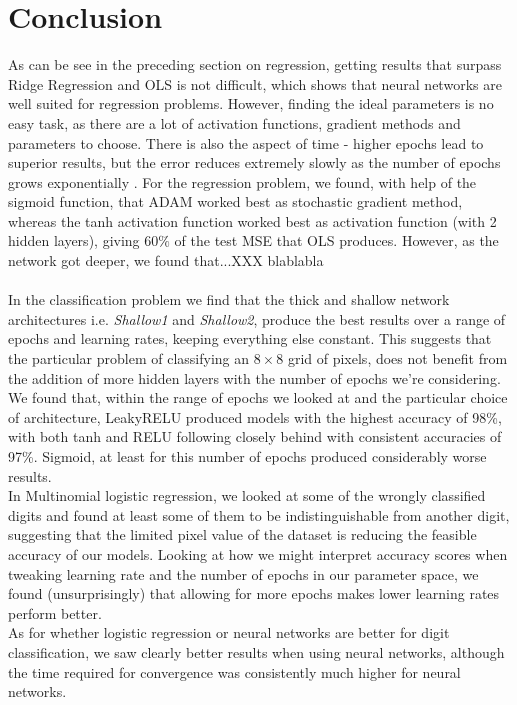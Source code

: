 \documentclass[11pt,a4paper,titlepage]{article}
\begin{document}
\section{Conclusion}
As can be see in the preceding section on regression, getting results that surpass Ridge Regression and OLS is not difficult, which shows that neural networks are well suited for regression problems. However, finding the ideal parameters is no easy task, as there are a lot of activation functions, gradient methods and parameters to choose. There is also the aspect of time - higher epochs lead to superior results, but the error reduces extremely slowly as the number of epochs grows exponentially \citep{handsOnMachineLearning}. For the regression problem, we found, with help of the sigmoid function, that ADAM worked best as stochastic gradient method, whereas the tanh activation function worked best as activation function (with 2 hidden layers), giving $60\%$ of the test MSE that OLS produces. However, as the network got deeper, we found that...XXX blablabla\\\\In the classification problem we find that the thick and shallow network architectures i.e. \emph{Shallow1} and \emph{Shallow2}, produce the best results over a range of epochs and learning rates, keeping everything else constant. This suggests that the particular problem of classifying an $8\times 8$ grid of pixels, does not benefit from the addition of more hidden layers with the number of epochs we're considering.\\We found that, within the range of epochs we looked at and the particular choice of architecture, LeakyRELU produced models with the highest accuracy of 98\%, with both tanh and RELU following closely behind with consistent accuracies of 97\%. Sigmoid, at least for this number of epochs produced considerably worse results.\\In Multinomial logistic regression, we looked at some of the wrongly classified digits and found at least some of them to be indistinguishable from another digit, suggesting that the limited pixel value of the dataset is reducing the feasible accuracy of our models. Looking at how we might interpret accuracy scores when tweaking learning rate and the number of epochs in our parameter space, we found (unsurprisingly) that allowing for more epochs makes lower learning rates perform better.\\As for whether logistic regression or neural networks are better for digit classification, we saw clearly better results when using neural networks, although the time required for convergence was consistently much higher for neural networks.
\end{document}
